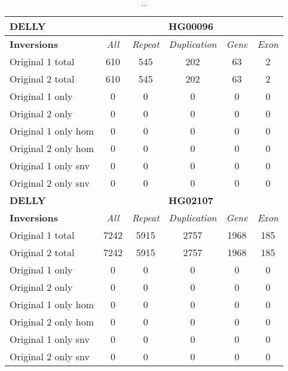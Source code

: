 \begin{table}[htb]
\begin{center}
\begin{tabular}{|l|c||c|c|c|c|}
\hline
{\bf DELLY} & \multicolumn{5}{|c|}{\bf HG00096} \\
\hline
\cline{2-6}
{\bf Inversions} & {\it All} & {\it Repeat} & {\it Duplication} & {\it Gene} & {\it Exon} \\
\hline
Original 1 total & 610 & 545 & 202 & 63 & 2\\ 
\hline
Original 2 total & 610 & 545 & 202 & 63 & 2\\ 
\hline
Original 1 only & 0 & 0 & 0 & 0 & 0\\ 
\hline
Original 2 only & 0 & 0 & 0 & 0 & 0\\ 
\hline
Original 1 only hom & 0 & 0 & 0 & 0 & 0\\ 
\hline
Original 2 only hom & 0 & 0 & 0 & 0 & 0\\ 
\hline
Original 1 only snv & 0 & 0 & 0 & 0 & 0\\ 
\hline
Original 2 only snv & 0 & 0 & 0 & 0 & 0\\ 
\hline
\hline
{\bf DELLY} & \multicolumn{5}{|c|}{\bf HG02107} \\
\hline
\cline{2-6}
{\bf Inversions} & {\it All} & {\it Repeat} & {\it Duplication} & {\it Gene} & {\it Exon} \\
\hline
Original 1 total & 7242 & 5915 & 2757 & 1968 & 185\\ 
\hline
Original 2 total & 7242 & 5915 & 2757 & 1968 & 185\\ 
\hline
Original 1 only & 0 & 0 & 0 & 0 & 0\\ 
\hline
Original 2 only & 0 & 0 & 0 & 0 & 0\\ 
\hline
Original 1 only hom & 0 & 0 & 0 & 0 & 0\\ 
\hline
Original 2 only hom & 0 & 0 & 0 & 0 & 0\\ 
\hline
Original 1 only snv & 0 & 0 & 0 & 0 & 0\\ 
\hline
Original 2 only snv & 0 & 0 & 0 & 0 & 0\\ 
\hline
\end{tabular}
\end{center}
\caption{ .. }
\label{tab:orig-vs-orig2-delly-inv}
\end{table}

